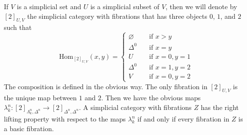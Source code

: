 \documentclass[reqno]{amsart}
\theoremstyle{definition}
\theoremstyle{remark}
\newcommand{\fs}[1]{\mathrm{#1}}
\newcommand{\Hom}{\fs{Hom}}
\numberwithin{figure}{section}
\begin{document}
If $V$ is a simplicial set and $U$ is a simplicial subset of $V$, then we will denote by $[2]_{U,V}$ the simplicial category with fibrations that has three objects $0$, $1$, and $2$ such that
\[ \Hom_{[2]_{U,V}}(x,y) =
  \begin{cases}
    \varnothing & \quad \text{if } x > y \\
    \Delta^0    & \quad \text{if } x = y \\
    U           & \quad \text{if } x = 0, y = 1 \\
    \Delta^0    & \quad \text{if } x = 1, y = 2 \\
    V           & \quad \text{if } x = 0, y = 2
  \end{cases}
\]
The composition is defined in the obvious way.
The only fibration in $[2]_{U,V}$ is the unique map between $1$ and $2$.
Then we have the obvious maps $\lambda^n_k : [2]_{\Lambda^n_k,\Delta^n} \to [2]_{\Delta^n,\Delta^n}$.
A simplicial category with fibrations $Z$ has the right lifting property with respect to the maps $\lambda^n_k$ if and only if every fibration in $Z$ is a basic fibration.
\end{document}

